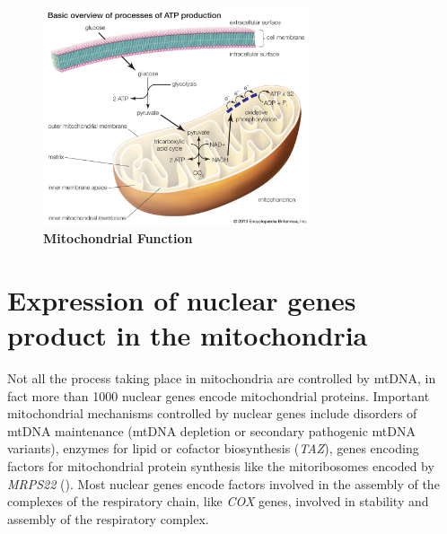 \begin{figure}[H]
\centering
\includegraphics[width=0.7\textwidth]{Fig/processes-production-ATP-glycolysis-tricarboxylic-acid-cycle.jpg}
\decoRule
\caption{\textbf{Mitochondrial Function}}
\label{fig:Mitochondrial Function}
\end{figure}


\newline

\section{Expression of nuclear genes product in the mitochondria}
Not all the process taking place in mitochondria are controlled by mtDNA, in fact more than 1000 nuclear genes encode mitochondrial proteins.
Important mitochondrial mechanisms controlled by nuclear genes include disorders of mtDNA maintenance (mtDNA depletion or secondary pathogenic mtDNA variants), enzymes for lipid or cofactor biosynthesis (\textit{TAZ}), genes encoding factors for mitochondrial protein synthesis like the mitoribosomes encoded by \textit{MRPS22} (\cite{caggese1999identification, chinnery2014mitochondrial}). 
Most nuclear genes encode factors involved in the assembly of the complexes of the respiratory chain, like \textit{COX} genes, involved in stability and assembly of the respiratory complex.


